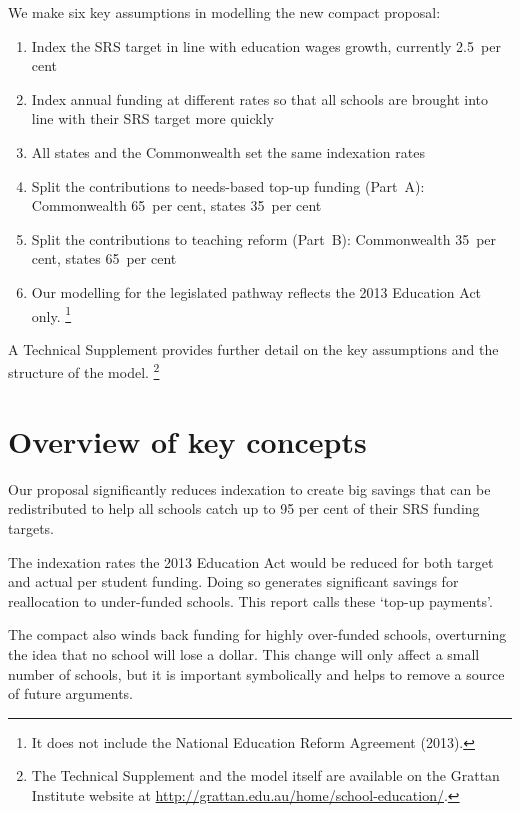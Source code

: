 \documentclass{grattan}
\begin{document}
We make six key assumptions in modelling the new compact proposal:
\begin{enumerate}%
\raggedright
\item Index the SRS target in line with education wages growth, currently 2.5~per cent
\item Index annual funding at different rates so that all schools are brought into line with their SRS target more quickly
\item All states and the Commonwealth set the same indexation rates
\item Split the contributions to needs-based top-up funding (Part~A): Commonwealth 65~per cent, states 35~per cent
\item Split the contributions to teaching reform (Part~B): Commonwealth 35~per cent, states 65~per cent
\item Our modelling for the legislated pathway reflects the 2013 Education Act only.%
\footnote{It does not include the National Education Reform Agreement (2013).}
\end{enumerate}

A Technical Supplement provides further detail on the key assumptions and the structure of the model.%
\footnote{The Technical Supplement and the model itself are available on the Grattan Institute website at \textcolor{blue}{\url{http://grattan.edu.au/home/school-education/}}.}

\label{chap:part-a-achieving-needs-based-funding}

\section{Overview of key concepts}\label{sec:overview-of-key-concepts}

Our proposal significantly reduces indexation to create big savings that can be redistributed to help all schools catch up to 95 per cent of their SRS funding targets.

The indexation rates the 2013 Education Act would be reduced for both target and actual per student funding.
Doing so generates significant savings for reallocation to under-funded schools.
This report calls these `top-up payments'.

The compact also winds back funding for highly over-funded schools, overturning the idea that no school will lose a dollar.
This change will only affect a small number of schools, but it is important symbolically and helps to remove a source of future arguments.
\end{document}
